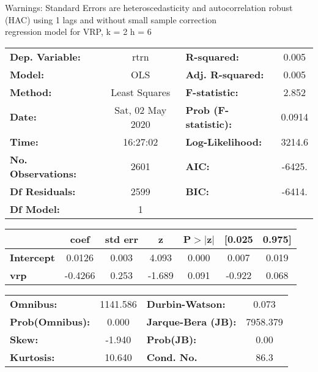 Warnings: \newline
 [1] Standard Errors are heteroscedasticity and autocorrelation robust (HAC) using 1 lags and without small sample correction\\ 

regression model for VRP, k = 2 h = 6\begin{center}
\begin{tabular}{lclc}
\toprule
\textbf{Dep. Variable:}    &       rtrn       & \textbf{  R-squared:         } &     0.005   \\
\textbf{Model:}            &       OLS        & \textbf{  Adj. R-squared:    } &     0.005   \\
\textbf{Method:}           &  Least Squares   & \textbf{  F-statistic:       } &     2.852   \\
\textbf{Date:}             & Sat, 02 May 2020 & \textbf{  Prob (F-statistic):} &   0.0914    \\
\textbf{Time:}             &     16:27:02     & \textbf{  Log-Likelihood:    } &    3214.6   \\
\textbf{No. Observations:} &        2601      & \textbf{  AIC:               } &    -6425.   \\
\textbf{Df Residuals:}     &        2599      & \textbf{  BIC:               } &    -6414.   \\
\textbf{Df Model:}         &           1      & \textbf{                     } &             \\
\bottomrule
\end{tabular}
\begin{tabular}{lcccccc}
                   & \textbf{coef} & \textbf{std err} & \textbf{z} & \textbf{P$> |$z$|$} & \textbf{[0.025} & \textbf{0.975]}  \\
\midrule
\textbf{Intercept} &       0.0126  &        0.003     &     4.093  &         0.000        &        0.007    &        0.019     \\
\textbf{vrp}       &      -0.4266  &        0.253     &    -1.689  &         0.091        &       -0.922    &        0.068     \\
\bottomrule
\end{tabular}
\begin{tabular}{lclc}
\textbf{Omnibus:}       & 1141.586 & \textbf{  Durbin-Watson:     } &    0.073  \\
\textbf{Prob(Omnibus):} &   0.000  & \textbf{  Jarque-Bera (JB):  } & 7958.379  \\
\textbf{Skew:}          &  -1.940  & \textbf{  Prob(JB):          } &     0.00  \\
\textbf{Kurtosis:}      &  10.640  & \textbf{  Cond. No.          } &     86.3  \\
\bottomrule
\end{tabular}
\end{center}

